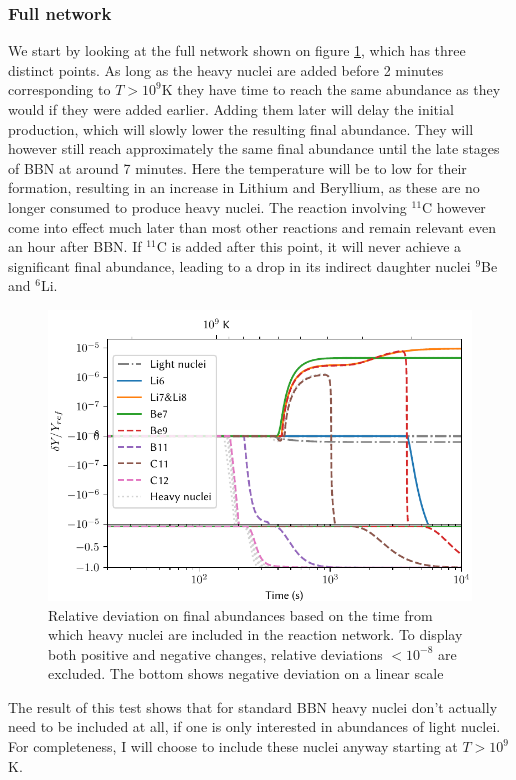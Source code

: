 \subsubsection{Full network}
We start by looking at the full network shown on figure \ref{fig:bignettime}, which has three distinct points. As long as the heavy nuclei are added before 2 minutes corresponding to $T>10^9$K they have time to reach the same abundance as they would if they were added earlier. Adding them later will delay the initial production, which will slowly lower the resulting final abundance. They will however still reach approximately the same final abundance until the late stages of BBN at around 7 minutes. Here the temperature will be to low for their formation, resulting in an increase in Lithium and Beryllium, as these are no longer consumed to produce heavy nuclei. The reaction involving ${}^{11}$C however come into effect much later than most other reactions and remain relevant even an hour after BBN. If ${}^{11}$C is added after this point, it will never achieve a significant final abundance, leading to a drop in its indirect daughter nuclei ${}^{9}$Be and ${}^{6}$Li. 
\begin{figure}[ht]
    \includegraphics[width=5.1in]{figures/Bignettime.pdf}
    \caption{Relative deviation on final abundances based on the time from which heavy nuclei are included in the reaction network. To display both positive and negative changes, relative deviations $ <10^{-8}$ are excluded. The bottom shows negative deviation on a linear scale}
    \label{fig:bignettime}
\end{figure}

The result of this test shows that for standard BBN heavy nuclei don't actually need to be included at all, if one is only interested in abundances of light nuclei. For completeness, I will choose to include these nuclei anyway starting at $T>10^9$K. 

